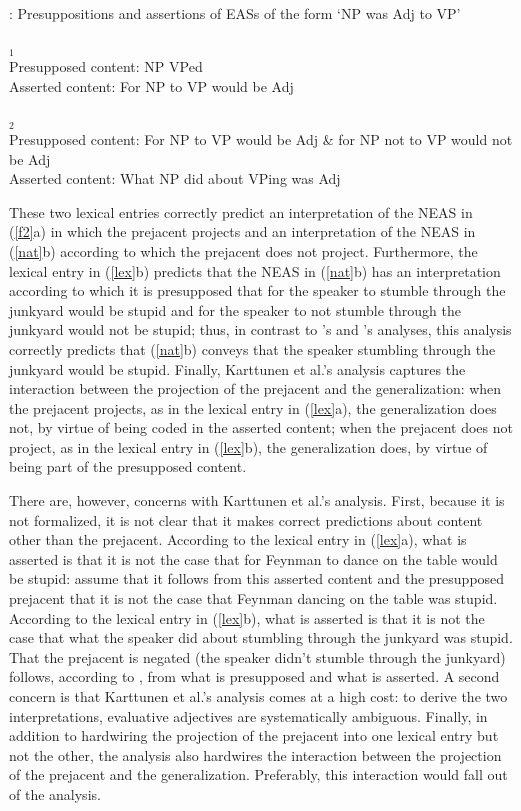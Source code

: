 \documentclass[11pt,fleqn]{article}
\newcommand{\6}{\mbox{$[\hspace*{-.6mm}[$}}
\newcommand{\9}{\mbox{$]\hspace*{-.6mm}]$}}
\newcommand{\citepos}[1]{\citeauthor{#1}'s \citeyear{#1}}
\begin{document}
\begin{exe}
\ex\label{lex} \citealt[249]{karttunen-etal2014}: Presuppositions and assertions of EASs of the form `NP was Adj to VP'
\begin{xlist}
$_1$
\\ Presupposed content: NP VPed
\\ Asserted content: For NP to VP would be Adj

$_2$
\\ Presupposed content: For NP to VP would be Adj \& for NP not to VP would not be Adj
\\ Asserted content: What NP did about VPing was Adj

\end{xlist}
\end{exe}
These two lexical entries correctly predict an interpretation of the NEAS in (\ref{f2}a) in which the prejacent projects and an interpretation of the NEAS in (\ref{nat}b) according to which the prejacent does not project. Furthermore, the lexical entry in (\ref{lex}b) predicts that the NEAS in (\ref{nat}b) has an interpretation according to which it is presupposed that for the speaker to stumble through the junkyard would be stupid and for the speaker to not stumble through the junkyard would not be stupid; thus, in contrast to \citepos{oshima09b} and \citepos{barker02} analyses, this analysis correctly predicts that (\ref{nat}b) conveys that the speaker stumbling through the junkyard would be stupid. Finally, Karttunen et al.'s analysis captures the interaction between the projection of the prejacent and the generalization: when the prejacent projects, as in the lexical entry in (\ref{lex}a), the generalization does not, by virtue of being coded in the asserted content;  when the prejacent does not project, as in the lexical entry in (\ref{lex}b), the generalization does, by virtue of being part of the presupposed content.

There are, however, concerns with Karttunen et al.'s analysis. First, because it is not formalized, it is not clear that it makes correct predictions about content other than the prejacent. According to the lexical entry in (\ref{lex}a), what is asserted is that it is not the case that for Feynman to dance on the table would be stupid: \citet[248]{karttunen-etal2014} assume that it follows from this asserted content and the presupposed prejacent that it is not the case that Feynman dancing on the table was stupid. According to the lexical entry in (\ref{lex}b), what is asserted is that it is not the case that what the speaker did about stumbling through the junkyard was stupid. That the prejacent is negated (the speaker didn't stumble through the junkyard) follows, according to \citealt[249]{karttunen-etal2014}, from what is presupposed and what is asserted. A second concern is that Karttunen et al.'s analysis comes at a high cost: to derive the two interpretations, evaluative adjectives are systematically ambiguous. Finally, in addition to hardwiring the projection of the prejacent into one lexical entry but not the other, the analysis also hardwires the interaction between the projection of the prejacent and the generalization. Preferably, this interaction would fall out of the analysis. 
\end{document}
